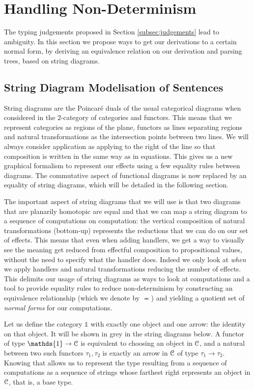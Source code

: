 \section{Handling Non-Determinism}
\label{sec:nondet}
The typing judgements proposed in Section \ref{subsec:judgements} lead to ambiguity.
In this section we propose ways to get our derivations to a certain normal form, by deriving an equivalence relation on our derivation and parsing trees, based on string diagrams.

\subsection{String Diagram Modelisation of Sentences}
\label{subsec:sd}
String diagrams are the Poincaré duals of the usual categorical diagrams when
considered in the $2$-category of categories and functors.
This means that we represent categories as regions of the plane, functors as
lines separating regions and natural transformations as the intersection points
between two lines.
We will always consider application as applying to the right of the line so
that composition is written in the same way as in equations.
This gives us a new graphical formalism to represent our effects using a few
equality rules between diagrams.
The commutative aspect of functional diagrams is now replaced by an equality of
string diagrams, which will be detailed in the following section.

The important aspect of string diagrams that we will use is that two diagrams that are planarily homotopic are equal \cite{joyalGeometryTensorCalculus1991} and that we can map a string diagram to a sequence of computations on computation: the vertical composition of natural transformations (bottom-up) represents the reductions that we can do on our set of effects.
This means that even when adding handlers, we get a way to visually see the meaning get reduced from effectful composition to propositional values, without the need to specify what the handler does.
Indeed we only look at \emph{when} we apply handlers and natural transformations reducing the number of effects.
This delimits our usage of string diagrams as ways to look at computations and a tool to provide equality rules to reduce non-determinism by constructing an equivalence relationship (which we denote by $\eqcirc$) and yielding a quotient set of \emph{normal forms} for our computations.

Let us define the category $\mathds{1}$ with exactly one object and one arrow: the identity on that object. It will be shown in grey in the string diagrams below.
A functor of type $\mathds{1} \to \mC$ is equivalent to choosing an object in $\mathcal{C}$, and a natural between two such functors $\tau_{1}, \tau_{2}$ is exactly an arrow in $\mathcal{C}$ of type $\tau_{1} \to \tau_{2}$.
Knowing that allows us to represent the type resulting from a sequence of computations as a sequence of strings whose farthest right represents an object in $\mathcal{C}$, that is, a base type.
\begin{wrapfigure}{l}{.45\textwidth}
	\begin{center}
		
	\end{center}
\end{wrapfigure}

